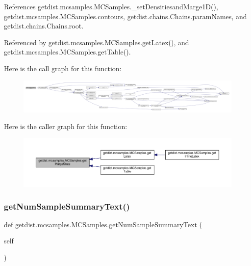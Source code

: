 References getdist.\+mcsamples.\+M\+C\+Samples.\+\_\+set\+Densitiesand\+Marge1\+D(), getdist.\+mcsamples.\+M\+C\+Samples.\+contours, getdist.\+chains.\+Chains.\+param\+Names, and getdist.\+chains.\+Chains.\+root.



Referenced by getdist.\+mcsamples.\+M\+C\+Samples.\+get\+Latex(), and getdist.\+mcsamples.\+M\+C\+Samples.\+get\+Table().

Here is the call graph for this function\+:
\nopagebreak
\begin{figure}[H]
\begin{center}
\leavevmode
\includegraphics[width=350pt]{classgetdist_1_1mcsamples_1_1MCSamples_ac23f96add8b4fc35b7dd3a922fae119f_cgraph}
\end{center}
\end{figure}
Here is the caller graph for this function\+:
\nopagebreak
\begin{figure}[H]
\begin{center}
\leavevmode
\includegraphics[width=350pt]{classgetdist_1_1mcsamples_1_1MCSamples_ac23f96add8b4fc35b7dd3a922fae119f_icgraph}
\end{center}
\end{figure}
\mbox{\label{classgetdist_1_1mcsamples_1_1MCSamples_a49be5a63d735fd9f9436b8f135371a6a}} 
\subsubsection{\texorpdfstring{get\+Num\+Sample\+Summary\+Text()}{getNumSampleSummaryText()}}
{\footnotesize\ttfamily def getdist.\+mcsamples.\+M\+C\+Samples.\+get\+Num\+Sample\+Summary\+Text (\begin{DoxyParamCaption}\item[{}]{self }\end{DoxyParamCaption})}

